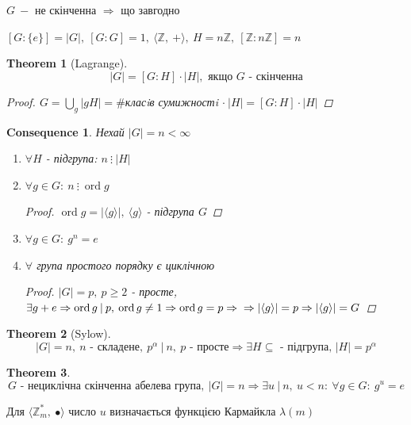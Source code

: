 \documentclass[a4paper,12pt, centered]{bookest}
\newtheorem{theorem}{Theorem}[section]
\newtheorem*{cons*}{Consequence}
\DeclareMathOperator{\ord}{ord}
\begin{document}
$G\>- $ не скінченна $\Rightarrow$ що завгодно
\begin{example}
	$[G:\{e\}]=|G|,\>[G:G]=1,\>\langle\mathbb{Z},\>+\rangle,\>H=n\mathbb{Z},\>[\mathbb{Z}:n\mathbb{Z}]=n$
\end{example}
\begin{theorem}[Lagrange]
	$$|G|=[G:H]\cdot|H|,\textrm{ якщо } G\textrm{ - скінченна}$$
	\begin{proof}
	$G=\bigcup\limits_{g}|gH|=\#$класiв сумижностi $\cdot\>|H|=[G:H]\cdot|H|$
\end{proof}
\end{theorem}
\begin{cons*}Нехай $|G|=n<\infty$
	\begin{enumerate}
		\item $\forall H$ - підгрупа: $n\>\vdots\>|H|$
		\item $\forall g\in G:\>n\>\vdots\>\ord g$ \begin{proof}
			$\ord g=|\langle g\rangle|,\>\langle g\rangle$ - підгрупа $G$
		\end{proof}
		\item $\forall g\in G:\>g^n=e$
		\item $\forall$ група простого порядку є циклічною\begin{proof}
			$|G|=p,\>p\geq 2$ - просте, $\exists g+e\Rightarrow\ord g\>|\>p,\>\ord g\neq1\Rightarrow\ord g=p\Rightarrow\\\Rightarrow|\langle g\rangle|=p\Rightarrow |\langle g\rangle|=G$
		\end{proof}
	\end{enumerate}
\end{cons*}
\begin{theorem}[Sylow]
	$$|G|=n,\>n\textrm{ - складене},\>p^\alpha\>|\>n,\>p\textrm{ - просте}\Rightarrow\exists H\subseteq\textrm{ - підгрупа, }|H|=p^\alpha$$
\end{theorem}
\begin{theorem}
	$$G\textrm{ - нециклічна скінченна абелева група},\>|G|=n\Rightarrow\exists u\>|\>n,\>u<n:\>\forall g\in G:\>g^u=e$$
\end{theorem}
Для $\langle\mathbb{Z}_m^*,\>\bullet\rangle$ число $u$ визначається функцією Кармайкла $\lambda(m)$
\end{document}
